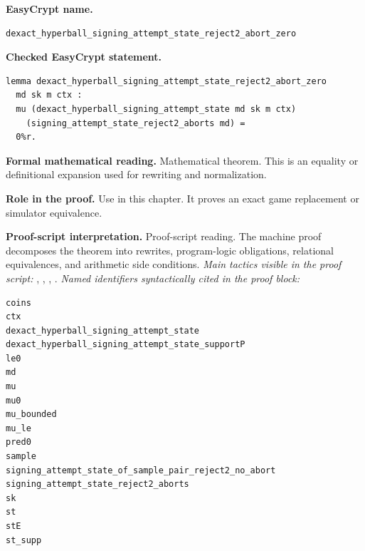 \begin{formaltheorem}
\noindent\textbf{EasyCrypt name.}
\begin{lstlisting}[language=EasyCrypt,basicstyle=\ttfamily\scriptsize]
dexact_hyperball_signing_attempt_state_reject2_abort_zero
\end{lstlisting}
\noindent\textbf{Checked EasyCrypt statement.}
\begin{lstlisting}[language=EasyCrypt,basicstyle=\ttfamily\scriptsize]
lemma dexact_hyperball_signing_attempt_state_reject2_abort_zero
  md sk m ctx :
  mu (dexact_hyperball_signing_attempt_state md sk m ctx)
    (signing_attempt_state_reject2_aborts md) =
  0%r.
\end{lstlisting}
\noindent\textbf{Formal mathematical reading.}
Mathematical theorem. This is an equality or definitional expansion used for rewriting and normalization.

\noindent\textbf{Role in the proof.}
Use in this chapter. It proves an exact game replacement or simulator equivalence.

\noindent\textbf{Proof-script interpretation.}
Proof-script reading. The machine proof decomposes the theorem into rewrites, program-logic obligations, relational equivalences, and arithmetic side conditions.
\emph{Main tactics visible in the proof script:} , , , .
\emph{Named identifiers syntactically cited in the proof block:}
\begin{lstlisting}[language=EasyCrypt,basicstyle=\ttfamily\scriptsize]
coins
ctx
dexact_hyperball_signing_attempt_state
dexact_hyperball_signing_attempt_state_supportP
le0
md
mu
mu0
mu_bounded
mu_le
pred0
sample
signing_attempt_state_of_sample_pair_reject2_no_abort
signing_attempt_state_reject2_aborts
sk
st
stE
st_supp
\end{lstlisting}

\end{formaltheorem}

